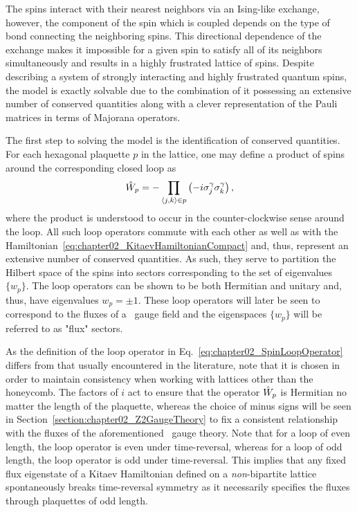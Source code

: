 The spins interact with their nearest neighbors via an Ising-like exchange, however, the component of the spin which is coupled depends on the type of bond connecting the neighboring spins.
This directional dependence of the exchange makes it impossible for a given spin to satisfy all of its neighbors simultaneously and results in a highly frustrated lattice of spins.
Despite describing a system of strongly interacting and highly frustrated quantum spins, the model is exactly solvable due to the combination of it possessing an extensive number of conserved quantities along with a clever representation of the Pauli matrices in terms of Majorana operators.

The first step to solving the model is the identification of conserved quantities.
For each hexagonal plaquette $p$ in the lattice, one may define a product of spins around the corresponding closed loop as
%
\begin{equation}
	\hat{W}_p = -\prod_{\langle j,k \rangle\in p} \left(-i \sigma_j^{\gamma} \sigma_k^{\gamma}\right),
	\label{eq:chapter02_SpinLoopOperator}
\end{equation}
%
where the product is understood to occur in the counter-clockwise sense around the loop.
All such loop operators commute with each other as well as with the Hamiltonian~\eqref{eq:chapter02_KitaevHamiltonianCompact} and, thus, represent an extensive number of conserved quantities.
As such, they serve to partition the Hilbert space of the spins into sectors corresponding to the set of eigenvalues $\{w_p\}$.
The loop operators can be shown to be both Hermitian and unitary and, thus, have eigenvalues $w_p = \pm 1$.
These loop operators will later be seen to correspond to the fluxes of a \ZZ~gauge field and the eigenspaces $\{w_p\}$ will be referred to as "flux" sectors.

As the definition of the loop operator in Eq.~\eqref{eq:chapter02_SpinLoopOperator} differs from that usually encountered in the literature, note that it is chosen in order to maintain consistency when working with lattices other than the honeycomb.
The factors of $i$ act to ensure that the operator $\hat{W}_p$ is Hermitian no matter the length of the plaquette, whereas the choice of minus signs will be seen in Section~\ref{section:chapter02_Z2GaugeTheory} to fix a consistent relationship with the fluxes of the aforementioned \ZZ~gauge theory.
Note that for a loop of even length, the loop operator is even under time-reversal, whereas for a loop of odd length, the loop operator is odd under time-reversal.
This implies that any fixed flux eigenstate of a Kitaev Hamiltonian defined on a \textit{non}-bipartite lattice spontaneously breaks time-reversal symmetry as it necessarily specifies the fluxes through plaquettes of odd length.

